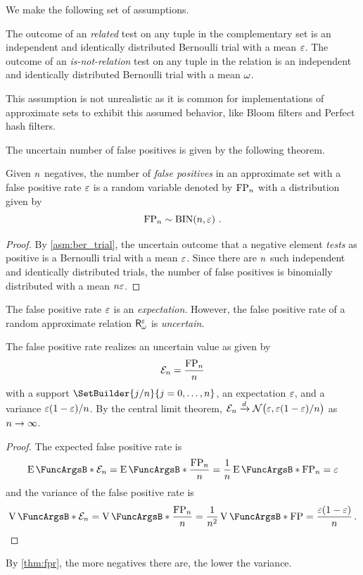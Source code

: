 \documentclass[11pt,final,hidelinks]{article}
\begin{document}
We make the following set of assumptions.
\begin{assumption}
	\label{asm:ber_trial}
	The outcome of an \emph{related} test on any tuple in the complementary set is an independent and identically distributed Bernoulli trial with a mean $\varepsilon$.
	The outcome of an \emph{is-not-relation} test on any tuple in the relation is an independent and identically distributed Bernoulli trial with a mean $\omega$.
\end{assumption}
This assumption is not unrealistic as it is common for implementations of approximate sets to exhibit this assumed behavior, like Bloom filters\cite{bf} and Perfect hash filters\cite{phf}.

The uncertain number of false positives is given by the following theorem.
\begin{theorem}
	\label{thm:fpbinom}
	Given $n$ negatives, the number of \emph{false positives} in an approximate set with a false positive rate $\varepsilon$ is a random variable denoted by $\mathrm{FP}_n$ with a distribution given by
	\begin{equation}
		\mathrm{FP}_n \sim \mathrm{BIN}\!\left(n, \varepsilon\right)\,.
	\end{equation}
\end{theorem}
\begin{proof}
	By \cref{asm:ber_trial}, the uncertain outcome that a negative element \emph{tests} as positive is a Bernoulli trial with a mean $\varepsilon$. Since there are $n$ such independent and identically distributed trials, the number of false positives is binomially distributed with a mean $n \varepsilon$.
\end{proof}

The false positive rate $\varepsilon$ is an \emph{expectation}. However, the false positive rate of a random approximate relation $\ARelation{R}[\fnrate][\fprate]$ is \emph{uncertain}.
\begin{theorem}
	\label{thm:fpr}
	The false positive rate realizes an uncertain value as given by
	\begin{equation}
		\mathcal{E}_n = \frac{\mathrm{FP}_n}{n}
	\end{equation}
	with a support $\SetBuilder{ j / \n}{j = 0,\ldots,\n}$, an expectation $\varepsilon$, and a variance $\varepsilon(1-\varepsilon) / n$. By the central limit theorem, $\mathcal{E}_n \xrightarrow{d} \mathcal{N}\!\left(\varepsilon, \varepsilon(1-\varepsilon) / n\right)$ as $n \to \infty$.
\end{theorem}
\begin{proof}
	The expected false positive rate is
	\begin{equation}
		\Expect{\FPR_\n} = \Expect{\frac{\FP_\n}{\n}} = \frac{1}{\n}\Expect{\FP_\n} = \fprate
	\end{equation}
	and the variance of the false positive rate is
	\begin{equation}
		\Var{\FPR_\n} = \Var{\frac{\FP_\n}{\n}} = \frac{1}{\n^2}\Var{\FP} = \frac{\fprate(1-\fprate)}{\n}\,.
	\end{equation}
\end{proof}
By \cref{thm:fpr}, the more negatives there are, the lower the variance.
\end{document}

